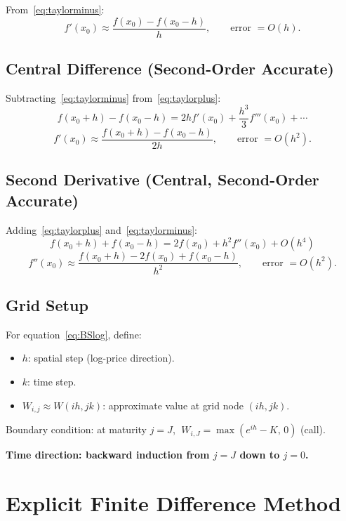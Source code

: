 \documentclass[12pt,a4paper]{article}
\theoremstyle{plain}
\theoremstyle{definition}
\theoremstyle{remark}
\newcommand{\OO}[1]{O\!\left(#1\right)}
\begin{document}
From~\eqref{eq:taylorminus}:
\begin{equation}\label{eq:backward}
  \boxed{f'(x_{0})\approx\frac{f(x_{0})-f(x_{0}-h)}{h},
  \qquad\text{error }=\OO{h}.}
\end{equation}

\subsection{Central Difference (Second-Order Accurate)}

Subtracting~\eqref{eq:taylorminus} from~\eqref{eq:taylorplus}:
\[
  f(x_{0}+h)-f(x_{0}-h)=2hf'(x_{0})+\frac{h^{3}}{3}f'''(x_{0})+\cdots
\]
\begin{equation}\label{eq:central}
  \boxed{f'(x_{0})\approx\frac{f(x_{0}+h)-f(x_{0}-h)}{2h},
  \qquad\text{error }=\OO{h^{2}}.}
\end{equation}

\subsection{Second Derivative (Central, Second-Order Accurate)}

Adding~\eqref{eq:taylorplus} and~\eqref{eq:taylorminus}:
\[
  f(x_{0}+h)+f(x_{0}-h)=2f(x_{0})+h^{2}f''(x_{0})+\OO{h^{4}}
\]
\begin{equation}\label{eq:second}
  \boxed{f''(x_{0})\approx
  \frac{f(x_{0}+h)-2f(x_{0})+f(x_{0}-h)}{h^{2}},
  \qquad\text{error }=\OO{h^{2}}.}
\end{equation}

\subsection{Grid Setup}

For equation~\eqref{eq:BSlog}, define:
\begin{itemize}
  \item $h$: spatial step (log-price direction).
  \item $k$: time step.
  \item $W_{i,j}\approx W(ih,jk)$: approximate value at grid node $(ih,jk)$.
\end{itemize}
Boundary condition: at maturity $j=J$,
$\;W_{i,J}=\max(e^{ih}-K,\,0)$ (call).

\textbf{Time direction: backward induction from $j=J$ down to $j=0$.}

\section{Explicit Finite Difference Method}
\end{document}
